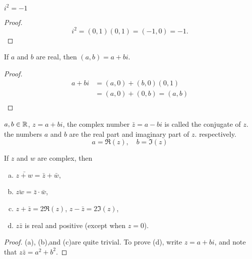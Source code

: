\begin{thm}
    \label{thm:1.28}
    $i^2=-1$
\end{thm}

\begin{proof}
    \begin{equation*}
        i^2=(0,1)(0,1)=(-1,0)=-1.
    \end{equation*}
\end{proof}

\begin{thm}
    \label{thm:1.29}
    If $a$ and $b$ are real, then $(a,b) =a + bi$.
\end{thm}

\begin{proof}
    \begin{align*}
        a+bi
        &=(a,0)+(b,0)(0,1)\\
        &=(a,0)+(0,b)=(a,b)\\
    \end{align*}
\end{proof}

\begin{mydef}
    \label{mydef:1.30}
    $a,b\in {\protect\mathbb R}$, $z = a + bi$,
    the complex number $\bar{z} = a  -bi$ is called the conjugate of $z$.
    the numbers $a$ and $b$ are the real part and imaginary part of $z$.
    respectively.
    \begin{equation*}
        a=\Re(z), \quad
        b=\Im(z)
    \end{equation*}
\end{mydef}

\begin{thm}
    \label{thm:1.31}
    If $z$ and $w$ are complex, then
    \begin{enumerate}[(a)]
        \item $\bar{z+w}=\bar{z}+\bar{w}$,
        \item $\bar{zw}=\bar{z}\cdot\bar{w}$,
        \item $z+\bar{z}=2\Re(z)$, $z-\bar{z}=2\Im(z)$,
        \item $z\bar{z}$ is real and positive (except when $z=0$).
    \end{enumerate}
\end{thm}

\begin{proof}
    (a), (b),and (c)are quite trivial.
    To prove (d), write $z = a + bi$,
    and note that $z\bar{z} = a^2 + b^2$.
\end{proof}


